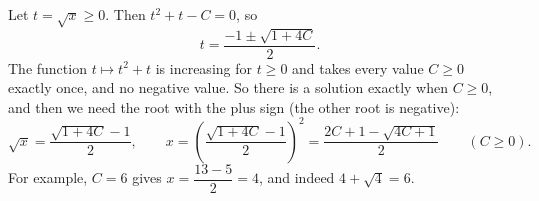 Let $t=\sqrt x\ge0$. Then $t^2+t-C=0$, so
\[
t=\dfrac{-1\pm\sqrt{1+4C}}{2}.
\]
The function $t\mapsto t^2+t$ is increasing for $t\ge0$ and takes every value $C\ge0$ exactly once, and no negative value. So there is a solution exactly when $C\ge0$, and then we need the root with the plus sign (the other root is negative):
\[
\sqrt x=\dfrac{\sqrt{1+4C}-1}{2},\qquad
x=\left(\dfrac{\sqrt{1+4C}-1}{2}\right)^2=\boxed{\dfrac{2C+1-\sqrt{4C+1}}{2}}\qquad(C\ge0).
\]
For example, $C=6$ gives $x=\dfrac{13-5}{2}=4$, and indeed $4+\sqrt4=6$.
